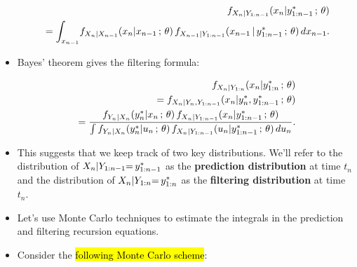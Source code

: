 \documentclass[]{article}
\providecommand{\tightlist}{%
  \setlength{\itemsep}{0pt}\setlength{\parskip}{0pt}}
\begin{document}
\begin{eqnarray}
&&f_{X_n|Y_{1:n-1}}(x_n|y^*_{1:n-1}\, ; \, \theta) 
\\
&&\quad
= \int_{x_{n-1}} \! f_{X_n|X_{n-1}}(x_n|x_{n-1}\, ; \,\theta)\, f_{X_{n-1}|Y_{1:n-1}}(x_{n-1}{\, | \,} y^*_{1:n-1}\, ; \, \theta) \, dx_{n-1}.
\end{eqnarray}

\begin{itemize}
\tightlist
\item
  Bayes' theorem gives the filtering formula:
\end{itemize}

\begin{eqnarray}
&&f_{X_n|Y_{1:n}}(x_n|y^*_{1:n}\, ; \, \theta)
\\
&&\quad = f_{X_n|Y_n,Y_{1:n-1}}(x_n|y^*_n,y^*_{1:n-1}\, ; \, \theta) 
\\
&&\quad =\frac{f_{Y_n|X_n}(y^*_{n}|x_{n}\, ; \,\theta)\,f_{X_n|Y_{1:n-1}}(x_{n}|y^*_{1:n-1}\, ; \,\theta)}{\int
f_{Y_n|X_n}(y^*_{n}|u_{n}\, ; \,\theta)\,f_{X_n|Y_{1:n-1}}(u_{n}|y^*_{1:n-1}\, ; \,\theta)\, du_n}.
\end{eqnarray}

\begin{itemize}
\item
  This suggests that we keep track of two key distributions. We'll refer
  to the distribution of \(X_n | Y_{1:n-1}{=\,} y^*_{1:n-1}\) as the
  \textbf{prediction distribution} at time \(t_n\) and the distribution
  of \(X_{n} | Y_{1:n}{=\,} y^*_{1:n}\) as the \textbf{filtering
  distribution} at time \(t_n\).
\item
  Let's use Monte Carlo techniques to estimate the integrals in the
  prediction and filtering recursion equations.
\item
  Consider the \hl{following Monte Carlo scheme}:
\end{itemize}
\end{document}
